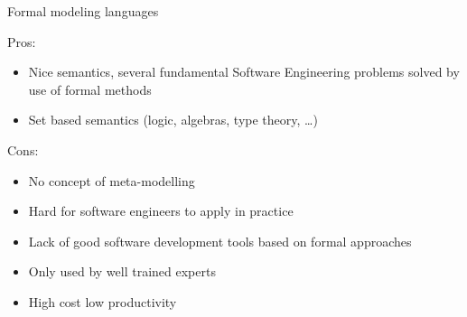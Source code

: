 \documentclass[slidetop,mathserif,red]{beamer}
\begin{document}
\begin{frame}{Formal modeling languages}

  Pros:
    \begin{itemize}
    \item Nice semantics, several fundamental
    Software Engineering
    problems solved by use of formal methods

    \item Set based semantics (logic, algebras, type theory, \ldots)
     \end{itemize}

   Cons:
   \begin{itemize}
    \item No concept of meta-modelling

    \item Hard for software engineers to apply in practice

    \item Lack of good software development tools based on formal
    approaches

    \item Only used by well trained experts

    \item High cost low productivity

    \end{itemize}
\end{frame}
\end{document}
